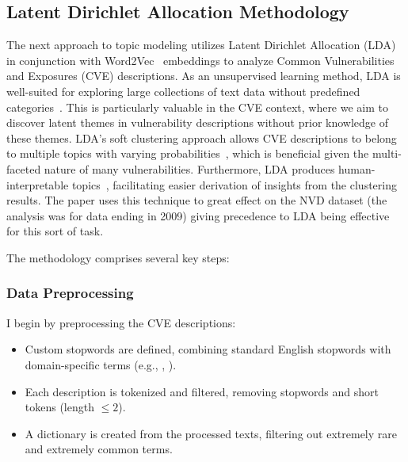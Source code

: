 \documentclass[12pt]{article}
\begin{document}
\subsection{Latent Dirichlet Allocation Methodology}

The next approach to topic modeling utilizes Latent Dirichlet Allocation (LDA)~\cite{lda_origin} in
conjunction with Word2Vec~\cite{word2vec} embeddings to analyze Common Vulnerabilities and Exposures
(CVE) descriptions. As an unsupervised learning method, LDA is well-suited for exploring large
collections of text data without predefined categories~\cite{lda_origin, latent_handbook}. This is
particularly valuable in the CVE context, where we aim to discover latent themes in vulnerability
descriptions without prior knowledge of these themes. LDA's soft clustering approach allows CVE
descriptions to belong to multiple topics with varying probabilities~\cite{latent_handbook}, which is beneficial given
the multi-faceted nature of many vulnerabilities. Furthermore, LDA produces human-interpretable
topics~\cite{lda_origin}, facilitating easier derivation of insights from the clustering results.
The paper \cite{cve_topic_modelling} uses this technique to great effect on the NVD
dataset (the analysis was for data ending in 2009) giving precedence to LDA being effective for this
sort of task.

The methodology comprises several key steps:

\subsubsection*{Data Preprocessing} I begin by preprocessing the CVE descriptions:

\begin{itemize}

	\item Custom stopwords are defined, combining standard English stopwords with domain-specific
	      terms (e.g., , ).

	\item Each description is tokenized and filtered, removing stopwords and short tokens (length
	      $\leq 2$).

	\item A dictionary is created from the processed texts, filtering out extremely rare and
	      extremely common terms.

\end{itemize}
\end{document}
